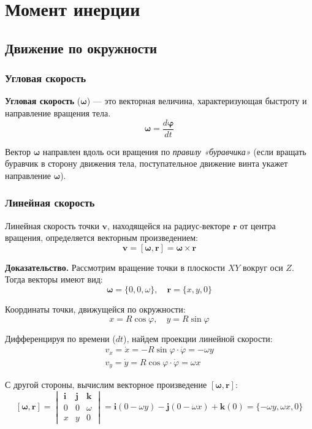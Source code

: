\section{Момент инерции}

\subsection{Движение по окружности}

\subsubsection{Угловая скорость}

\textbf{Угловая скорость} ($\boldsymbol{\omega}$) — это векторная величина, характеризующая быстроту и направление вращения тела.
\[
\boldsymbol{\omega} = \frac{d\boldsymbol{\varphi}}{dt}
\]

Вектор $\boldsymbol{\omega}$ направлен вдоль оси вращения по \textit{правилу «буравчика»} (если вращать буравчик в сторону движения тела, поступательное движение винта укажет направление $\boldsymbol{\omega}$).

\subsubsection{Линейная скорость}

Линейная скорость точки $\mathbf{v}$, находящейся на радиус-векторе $\mathbf{r}$ от центра вращения, определяется векторным произведением:
\[
\mathbf{v} = [\boldsymbol{\omega}, \mathbf{r}] = \boldsymbol{\omega} \times \mathbf{r}
\]

\textbf{Доказательство.} Рассмотрим вращение точки в плоскости $XY$ вокруг оси $Z$.
Тогда векторы имеют вид:
\[
\boldsymbol{\omega} = \{0, 0, \omega\}, \quad \mathbf{r} = \{x, y, 0\}
\]

Координаты точки, движущейся по окружности:
\[
x = R \cos \varphi, \quad y = R \sin \varphi
\]

Дифференцируя по времени ($dt$), найдем проекции линейной скорости:
\[\begin{gathered}
v_x = \dot{x} = -R \sin \varphi \cdot \dot{\varphi} = -\omega y\\
v_y = \dot{y} = R \cos \varphi \cdot \dot{\varphi} = \omega x
\end{gathered}
\]

С другой стороны, вычислим векторное произведение $[\boldsymbol{\omega}, \mathbf{r}]$:
\[
[\boldsymbol{\omega}, \mathbf{r}] = 
\begin{vmatrix} 
\mathbf{i} & \mathbf{j} & \mathbf{k} \\ 
0 & 0 & \omega \\ 
x & y & 0 
\end{vmatrix} = 
\mathbf{i}(0 - \omega y) - \mathbf{j}(0 - \omega x) + \mathbf{k}(0) = \{-\omega y, \omega x, 0\}
\]

